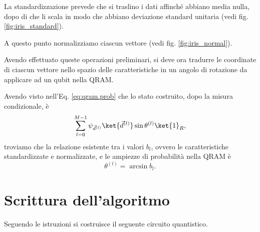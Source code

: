 La standardizzazione prevede che si traslino i dati affinché abbiano media nulla, 
dopo di che li scala in modo che abbiano deviazione standard unitaria 
(vedi fig. \ref{fig:iris_standard}). 

A questo punto normalizziamo ciascun vettore (vedi fig. \ref{fig:iris_normal}). 

Avendo effettuato queste operazioni preliminari, si deve ora tradurre le coordinate 
di ciascun vettore nello spazio delle caratteristiche in un angolo di rotazione 
da applicare ad un qubit nella \ac{QRAM}. 

Avendo visto nell'Eq. \ref{eq:qram.prob} che lo stato costruito, dopo la misura condizionale, è 
\begin{equation}
    \sum_{l=0}^{M-1} \psi_{\vec{d}^{(l)}}\ket{\vec{d}^{(l)}}\sin\theta^{(l)}\ket{1}_R,
\end{equation}
troviamo che la relazione esistente tra i valori $b_l$, ovvero le caratteristiche standardizzate e normalizzate, 
e le ampiezze di probabilità nella \ac{QRAM} è 
\begin{equation}
    \theta^{(l)} = \arcsin b_l. 
\end{equation}

\section{Scrittura dell'algoritmo}

Seguendo le istruzioni si costruisce il seguente circuito quantistico. 


\begin{figure}[ht]
    \label{fig:circuitoquantistico}
\end{figure}

